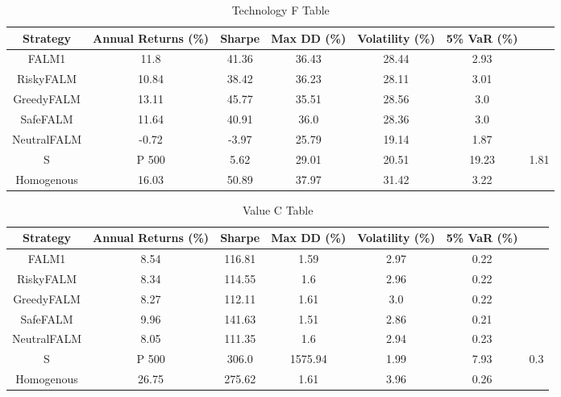 \begin{table}[]
    \centering
    \caption{Technology F Table}
    \begin{tabular}{|c|c|c|c|c|c|c|}
        \hline
        Strategy & Annual Returns (\%) & Sharpe & Max \ac{DD} (\%) & Volatility (\%)& 5\% \ac{VaR} (\%) \\
        \hline
        FALM1 & 11.8 & 41.36 & 36.43 & 28.44 & 2.93 \\
        RiskyFALM & 10.84 & 38.42 & 36.23 & 28.11 & 3.01 \\
        GreedyFALM & 13.11 & 45.77 & 35.51 & 28.56 & 3.0 \\
        SafeFALM & 11.64 & 40.91 & 36.0 & 28.36 & 3.0 \\
        NeutralFALM & -0.72 & -3.97 & 25.79 & 19.14 & 1.87 \\
        S&P 500 & 5.62 & 29.01 & 20.51 & 19.23 & 1.81 \\
        Homogenous & 16.03 & 50.89 & 37.97 & 31.42 & 3.22 \\
        \hline
    \end{tabular}
    \label{tab:technology_f_table}
\end{table}

\begin{table}[]
    \centering
    \caption{Value C Table}
    \begin{tabular}{|c|c|c|c|c|c|c|}
        \hline
        Strategy & Annual Returns (\%) & Sharpe & Max \ac{DD} (\%) & Volatility (\%)& 5\% \ac{VaR} (\%) \\
        \hline
        FALM1 & 8.54 & 116.81 & 1.59 & 2.97 & 0.22 \\
        RiskyFALM & 8.34 & 114.55 & 1.6 & 2.96 & 0.22 \\
        GreedyFALM & 8.27 & 112.11 & 1.61 & 3.0 & 0.22 \\
        SafeFALM & 9.96 & 141.63 & 1.51 & 2.86 & 0.21 \\
        NeutralFALM & 8.05 & 111.35 & 1.6 & 2.94 & 0.23 \\
        S&P 500 & 306.0 & 1575.94 & 1.99 & 7.93 & 0.3 \\
        Homogenous & 26.75 & 275.62 & 1.61 & 3.96 & 0.26 \\
        \hline
    \end{tabular}
    \label{tab:value_c_table}
\end{table}

